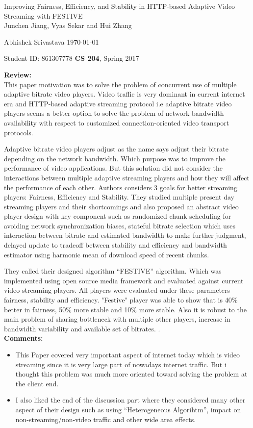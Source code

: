 \documentclass[a4paper,12pt, twoside]{article}
\renewcommand{\maketitle}{%
 	\Large
 	\begin{center}
 	Improving Fairness, Efficiency, and Stability in
 	HTTP-based Adaptive Video Streaming with FESTIVE\\	
 	\normalsize Junchen Jiang, Vyas Sekar and Hui Zhang
 	\end{center}
 
 	\Large
	Abhishek Srivastava
	\hfill
	\normalsize
	\today
 	\par
 	Student ID: 861307778
 	\hfill
 	\textbf{CS 204}, Spring 2017
 	\par 	
 	\hrulefill
 	\par
 	}
\begin{document}
\thispagestyle{empty}
	
\maketitle

\textbf{Review:}\\

This paper motivation was to solve the problem of concurrent use of multiple adaptive bitrate video players. Video traffic is very dominant in current internet era and HTTP-based adaptive streaming protocol i.e adaptive bitrate video players seems a better option to solve the problem of network bandwidth availability with respect to customized connection-oriented video transport protocols.

Adaptive bitrate video players adjust as the name says adjust their bitrate depending on the network bandwidth. Which purpose was to improve the performance of video applications. But this solution did not consider the interactions between multiple adaptive streaming players and how they will affect the performance of each other. Authors considers 3 goals for better streaming players: Fairness, Efficiency and Stability. They studied multiple present day streaming players and their shortcomings and also proposed an abstract video player design with key component such as randomized chunk scheduling for avoiding network synchronization biases, stateful bitrate selection which uses interaction between bitrate and estimated bandwidth to make further judgment, delayed update to tradeoff between stability and efficiency and bandwidth estimator using harmonic mean of download speed of recent chunks.  

They called their designed algorithm ``FESTIVE'' algorithm. Which was implemented using open source media framework and evaluated against current video streaming players. All players were evaluated under these parameters fairness, stability and efficiency. "Festive" player was able to show that is 40\% better in fairness, 50\% more stable and 10\% more stable. Also it is robust to the main problem of sharing bottleneck with multiple other players, increase in bandwidth variability and available set of bitrates.   
.\\

\textbf{Comments:}
\begin{itemize}
	\item This Paper covered very important aspect of internet today which is video streaming since it is very large part of nowadays internet traffic. But i thought this problem was much more oriented toward solving the problem at the client end.
	\item I also liked the end of the discussion part where they considered many other aspect of their design such as using ``Heterogeneous Algorihtm'', impact on non-streaming/non-video traffic and other wide area effects.  
\end{itemize}
\end{document}
